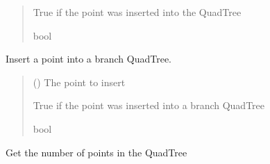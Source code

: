\documentclass[letterpaper,10pt,english]{sphinxmanual}
\begin{document}
\begin{fulllineitems}
\begin{fulllineitems}
\begin{quote}
\begin{description}
\sphinxAtStartPar
True if the point was inserted into the QuadTree

\sphinxAtStartPar
bool

\end{description}\end{quote}

\end{fulllineitems}


\begin{fulllineitems}
\label{\detokenize{quadtree:geotrees.quadtree.QuadTree.insert_into_branch}}
\pysigstartsignatures
\pysiglinewithargsret
{}
{}
{}
\pysigstopsignatures
\sphinxAtStartPar
Insert a point into a branch QuadTree.
\begin{quote}\begin{description}
\sphinxAtStartPar
{} ({\hyperref[\detokenize{record:geotrees.record.Record}]{}}) \textendash{} The point to insert

\sphinxAtStartPar
True if the point was inserted into a branch QuadTree

\sphinxAtStartPar
bool

\end{description}\end{quote}

\end{fulllineitems}


\begin{fulllineitems}
\label{\detokenize{quadtree:geotrees.quadtree.QuadTree.len}}
\pysigstartsignatures
\pysiglinewithargsret
{}
{}
{}
\pysigstopsignatures
\sphinxAtStartPar
Get the number of points in the QuadTree
\begin{quote}\begin{description}
\sphinxAtStartPar
{}


\end{description}
\end{quote}
\end{fulllineitems}
\end{fulllineitems}
\end{document}
